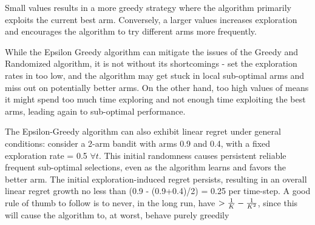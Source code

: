 
Small \epsilonFunction \space values results in a more greedy strategy where the algorithm primarily exploits the current best arm. Conversely, a larger  \epsilonFunction \space values increases exploration and encourages the algorithm to try different arms more frequently.

While the Epsilon Greedy algorithm can mitigate the issues of the Greedy and Randomized algorithm, it is not without its shortcomings - set the exploration rates in \epsilonFunction \space too low, and the algorithm may get stuck in local sub-optimal arms and miss out on potentially better arms. On the other hand, too high values of \epsilonFunction \space means it might spend too much time exploring and not enough time exploiting the best arms, leading again to sub-optimal performance.

The Epsilon-Greedy algorithm can also exhibit linear regret under general conditions: consider a 2-arm bandit with arms 0.9 and 0.4, with a fixed exploration rate \epsilonFunction \space = 0.5 $\forall t$. This initial randomness causes persistent reliable frequent sub-optimal selections, even as the algorithm learns and favors the better arm. The initial exploration-induced regret persists, resulting in an overall linear regret growth no less than (0.9 - (0.9+0.4)/2) = 0.25 per time-step. A good rule of thumb to follow is to never, in the long run, have \epsilonFunction $> \frac{1}{K} - \frac{1}{K^2}$, since this will cause the algorithm to, at worst, behave purely greedily


